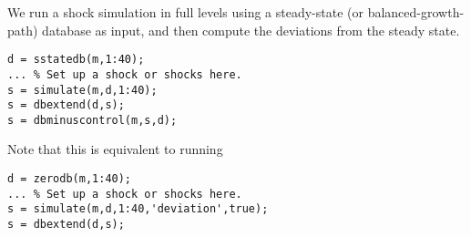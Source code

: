 We run a shock simulation in full levels using a steady-state (or
balanced-growth-path) database as input, and then compute the deviations
from the steady state.

\begin{verbatim}
d = sstatedb(m,1:40);
... % Set up a shock or shocks here.
s = simulate(m,d,1:40);
s = dbextend(d,s);
s = dbminuscontrol(m,s,d);
\end{verbatim}

Note that this is equivalent to running

\begin{verbatim}
d = zerodb(m,1:40);
... % Set up a shock or shocks here.
s = simulate(m,d,1:40,'deviation',true);
s = dbextend(d,s);
\end{verbatim}


